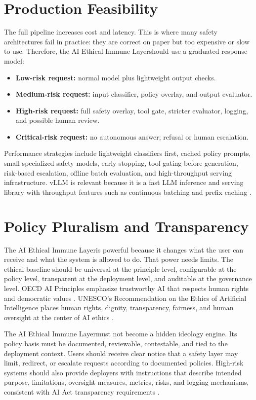 \documentclass[11pt]{article}
\newcommand{\AEIL}{AI Ethical Immune Layer}
\begin{document}
\section{Production Feasibility}

The full pipeline increases cost and latency. This is where many safety architectures fail in practice: they are correct on paper but too expensive or slow to use. Therefore, the \AEIL should use a graduated response model:

\begin{itemize}
  \item \textbf{Low-risk request:} normal model plus lightweight output checks.
  \item \textbf{Medium-risk request:} input classifier, policy overlay, and output evaluator.
  \item \textbf{High-risk request:} full safety overlay, tool gate, stricter evaluator, logging, and possible human review.
  \item \textbf{Critical-risk request:} no autonomous answer; refusal or human escalation.
\end{itemize}

Performance strategies include lightweight classifiers first, cached policy prompts, small specialized safety models, early stopping, tool gating before generation, risk-based escalation, offline batch evaluation, and high-throughput serving infrastructure. vLLM is relevant because it is a fast LLM inference and serving library with throughput features such as continuous batching and prefix caching \citep{vllm2026docs}.

\section{Policy Pluralism and Transparency}

The \AEIL is powerful because it changes what the user can receive and what the system is allowed to do. That power needs limits. The ethical baseline should be universal at the principle level, configurable at the policy level, transparent at the deployment level, and auditable at the governance level. OECD AI Principles emphasize trustworthy AI that respects human rights and democratic values \citep{oecd2026principles}. UNESCO's Recommendation on the Ethics of Artificial Intelligence places human rights, dignity, transparency, fairness, and human oversight at the center of AI ethics \citep{unesco2024ethics}.

The \AEIL must not become a hidden ideology engine. Its policy basis must be documented, reviewable, contestable, and tied to the deployment context. Users should receive clear notice that a safety layer may limit, redirect, or escalate requests according to documented policies. High-risk systems should also provide deployers with instructions that describe intended purpose, limitations, oversight measures, metrics, risks, and logging mechanisms, consistent with AI Act transparency requirements \citep{euai2024article13}.
\end{document}
